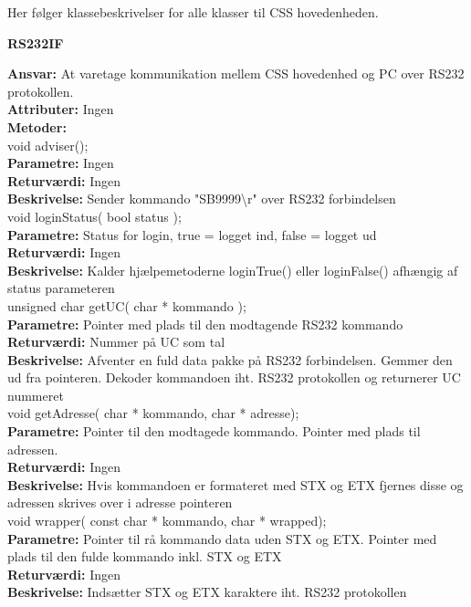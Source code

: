 Her følger klassebeskrivelser for alle klasser til CSS hovedenheden. \\

%
%
{\centering
\textbf{RS232IF}\par
}
\textbf{Ansvar:} At varetage kommunikation mellem CSS hovedenhed og PC over RS232 protokollen. \\
\textbf{Attributer:} Ingen \\
\textbf{Metoder:} \\
void adviser(); \\
\textbf{Parametre:} Ingen \\
\textbf{Returværdi:} Ingen \\
\textbf{Beskrivelse:} Sender kommando "SB9999\textbackslash r" over RS232 forbindelsen \\

void loginStatus( bool status ); \\
\textbf{Parametre:} Status for login, true = logget ind, false = logget ud  \\
\textbf{Returværdi:} Ingen \\
\textbf{Beskrivelse:} Kalder hjælpemetoderne loginTrue() eller loginFalse() afhængig af status parameteren \\

unsigned char getUC( char * kommando ); \\
\textbf{Parametre:} Pointer med plads til den modtagende RS232 kommando \\
\textbf{Returværdi:} Nummer på UC som tal \\
\textbf{Beskrivelse:} Afventer en fuld data pakke på RS232 forbindelsen. Gemmer den ud fra pointeren. Dekoder kommandoen iht. RS232 protokollen og returnerer UC nummeret \\

void getAdresse( char * kommando, char * adresse); \\
\textbf{Parametre:} Pointer til den modtagede kommando. Pointer med plads til adressen. \\
\textbf{Returværdi:} Ingen \\
\textbf{Beskrivelse:} Hvis kommandoen er formateret med STX og ETX fjernes disse og adressen skrives over i adresse pointeren \\

void wrapper( const char * kommando, char * wrapped); \\
\textbf{Parametre:} Pointer til rå kommando data uden STX og ETX. Pointer med plads til den fulde kommando inkl. STX og ETX \\
\textbf{Returværdi:} Ingen \\
\textbf{Beskrivelse:} Indsætter STX og ETX karaktere iht. RS232 protokollen\\

